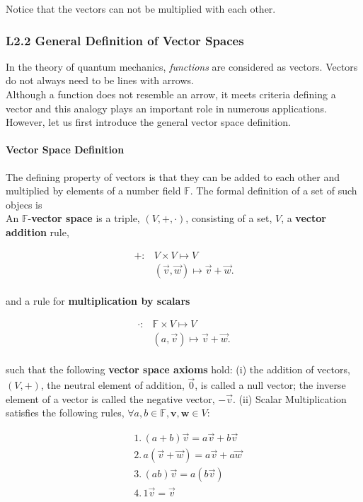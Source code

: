 \documentclass[11pt, oneside]{article}   	%
\begin{document}
  Notice that the vectors can not be multiplied with each other. 

\subsubsection{L2.2 General Definition of Vector Spaces}

In the theory of quantum mechanics, \textit{functions} are considered as
vectors. Vectors do not always need to be lines with arrows. \\

Although a function does not resemble an arrow, it meets criteria defining
a vector and this analogy plays an important role in numerous applications. \\

However, let us first introduce the general vector space definition. 

\paragraph{Vector Space Definition} 

The defining property of vectors is that they can be added to each other and
multiplied by elements of a number field $\mathbb{F}$. The formal definition of
a set of such objecs is \\
An $\mathbb{F}$-\textbf{vector space} is a triple, $(V, +, \cdot)$, consisting
of a set, $V$, a \textbf{vector addition} rule, 

\begin{align*}
  + : &V \times V \mapsto V \\
      &(\vec{v}, \vec{w} ) \mapsto \vec{v} + \vec{w}. 
\end{align*}\\ 

and a rule for \textbf{multiplication by scalars}

\begin{align*}
  \cdot :& \mathbb{F} \times V \mapsto V \\
  &(a, \vec{v}) \mapsto \vec{v} + \vec{w}. 
\end{align*}\\ 

such that the following \textbf{vector space axioms} hold: (i) the addition of
vectors, $(V,+)$, the neutral element of addition, $\vec{0}$, is called a null
vector; the inverse element of a vector is called the negative vector,
$-\vec{v}$. (ii) Scalar Multiplication satisfies the following rules, $\forall
a, b \in \mathbb{F}, \textbf{v}, \textbf{w} \in V$:

\begin{align*}
&1. \, (a+b)\vec{v} = a\vec{v}  + b\vec{v} \\
&2. \, a(\vec{v} + \vec{w}) = a\vec{v} + a\vec{w} \\
&3. \,(ab)\vec{v} = a(b\vec{v}) \\ 
&4. \,1\vec{v} = \vec{v}  
\end{align*}
\end{document}
